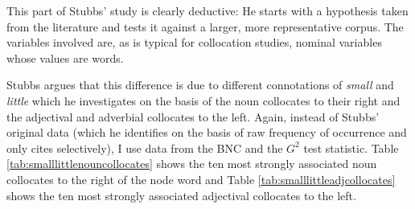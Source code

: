 This part of Stubbs' study is clearly deductive: He starts with a hypothesis taken from the literature and tests it against a larger, more representative corpus. The variables involved are, as is typical for collocation studies, nominal variables whose values are words.

Stubbs argues that this difference is due to different connotations of \textit{small} and \textit{little} which he investigates on the basis of the noun collocates to their right and the adjectival and adverbial collocates to the left. Again, instead of Stubbs' original data (which he identifies on the basis of raw frequency of occurrence and only cites selectively), I use data from the BNC and the $G^2$ test statistic. Table \ref{tab:smalllittlenouncollocates} shows the ten most strongly associated noun collocates to the right of the node word and Table \ref{tab:smalllittleadjcollocates} shows the ten most strongly associated adjectival collocates to the left.

